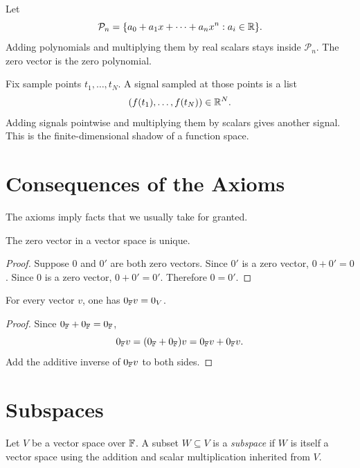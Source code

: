 \begin{example}
Let
\[
  \mathcal P_n
  =
  \{a_0+a_1x+\cdots+a_nx^n : a_i\in\mathbb{R}\}.
\]
Adding polynomials and multiplying them by real scalars stays inside
$\mathcal P_n$. The zero vector is the zero polynomial.
\end{example}

\begin{example}
Fix sample points $t_1,\ldots,t_N$. A signal sampled at those points is a list
\[
  (f(t_1),\ldots,f(t_N))\in\mathbb{R}^N.
\]
Adding signals pointwise and multiplying them by scalars gives another signal.
This is the finite-dimensional shadow of a function space.
\end{example}

\section{Consequences of the Axioms}

The axioms imply facts that we usually take for granted.

\begin{proposition}
  The zero vector in a vector space is unique.
\end{proposition}

\begin{proof}
  Suppose $0$ and $0'$ are both zero vectors. Since $0'$ is a zero vector,
  $0+0'=0$. Since $0$ is a zero vector, $0+0'=0'$. Therefore $0=0'$.
\end{proof}

\begin{proposition}
  For every vector $v$, one has $0_{\mathbb{F}}v=0_V$.
\end{proposition}

\begin{proof}
  Since $0_{\mathbb{F}}+0_{\mathbb{F}}=0_{\mathbb{F}}$,
  \[
    0_{\mathbb{F}}v=(0_{\mathbb{F}}+0_{\mathbb{F}})v=0_{\mathbb{F}}v+0_{\mathbb{F}}v.
  \]
  Add the additive inverse of $0_{\mathbb{F}}v$ to both sides.
\end{proof}

\section{Subspaces}

\begin{definition}
  Let $V$ be a vector space over $\mathbb{F}$. A subset $W\subseteq V$ is a
  \emph{subspace} if $W$ is itself a vector space using the addition and scalar
  multiplication inherited from $V$.
\end{definition}

